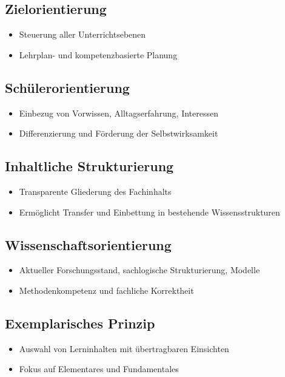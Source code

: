 \subsection{Zielorientierung}
\begin{itemize}[leftmargin=*]
  \item Steuerung aller Unterrichtsebenen
  \item Lehrplan- und kompetenzbasierte Planung
\end{itemize}

\subsection{Schülerorientierung}
\begin{itemize}[leftmargin=*]
  \item Einbezug von Vorwissen, Alltagserfahrung, Interessen
  \item Differenzierung und Förderung der Selbstwirksamkeit
\end{itemize}

\subsection{Inhaltliche Strukturierung}
\begin{itemize}[leftmargin=*]
  \item Transparente Gliederung des Fachinhalts
  \item Ermöglicht Transfer und Einbettung in bestehende Wissensstrukturen
\end{itemize}

\subsection{Wissenschaftsorientierung}
\begin{itemize}[leftmargin=*]
  \item Aktueller Forschungsstand, sachlogische Strukturierung, Modelle
  \item Methodenkompetenz und fachliche Korrektheit
\end{itemize}

\subsection{Exemplarisches Prinzip}
\begin{itemize}[leftmargin=*]
  \item Auswahl von Lerninhalten mit übertragbaren Einsichten
  \item Fokus auf Elementares und Fundamentales
\end{itemize}

